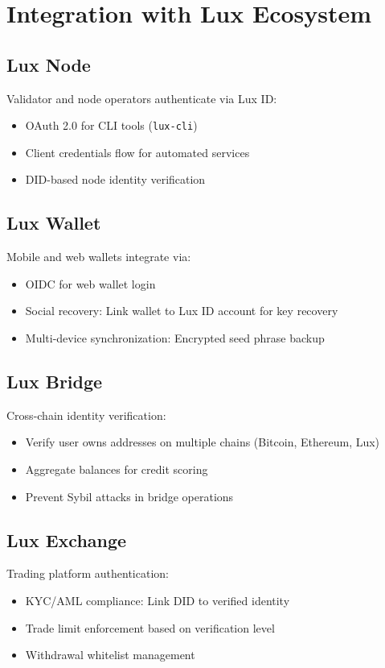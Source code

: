 \section{Integration with Lux Ecosystem}


\subsection{Lux Node}

Validator and node operators authenticate via Lux ID:
\begin{itemize}
  \item OAuth 2.0 for CLI tools (\texttt{lux-cli})
  \item Client credentials flow for automated services
  \item DID-based node identity verification
\end{itemize}

\subsection{Lux Wallet}

Mobile and web wallets integrate via:
\begin{itemize}
  \item OIDC for web wallet login
  \item Social recovery: Link wallet to Lux ID account for key recovery
  \item Multi-device synchronization: Encrypted seed phrase backup
\end{itemize}

\subsection{Lux Bridge}

Cross-chain identity verification:
\begin{itemize}
  \item Verify user owns addresses on multiple chains (Bitcoin, Ethereum, Lux)
  \item Aggregate balances for credit scoring
  \item Prevent Sybil attacks in bridge operations
\end{itemize}

\subsection{Lux Exchange}

Trading platform authentication:
\begin{itemize}
  \item KYC/AML compliance: Link DID to verified identity
  \item Trade limit enforcement based on verification level
  \item Withdrawal whitelist management
\end{itemize}


